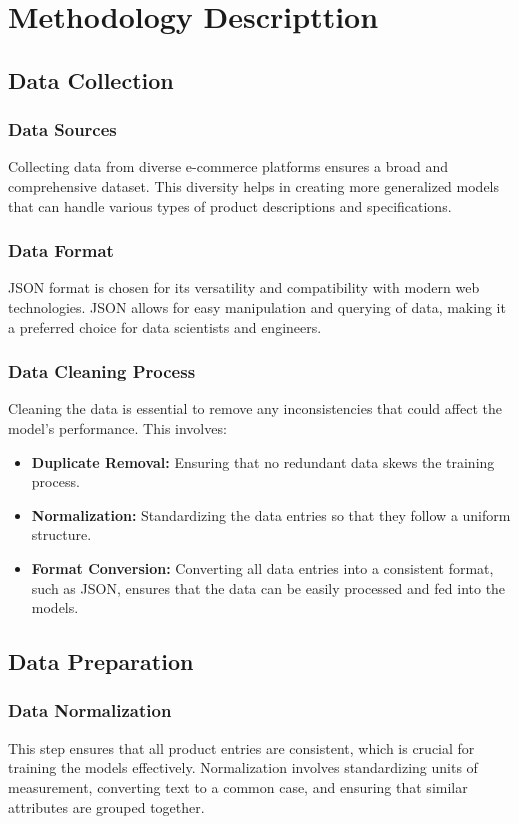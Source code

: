 \section{Methodology Descripttion}
\subsection{Data Collection}
\subsubsection{Data Sources}
Collecting data from diverse e-commerce platforms ensures a broad and comprehensive dataset. This diversity helps in creating more generalized models that can handle various types of product descriptions and specifications.

\subsubsection{Data Format}
JSON format is chosen for its versatility and compatibility with modern web technologies. JSON allows for easy manipulation and querying of data, making it a preferred choice for data scientists and engineers.

\subsubsection{Data Cleaning Process}
Cleaning the data is essential to remove any inconsistencies that could affect the model's performance. This involves:

\begin{itemize}
    \item \textbf{Duplicate Removal:} Ensuring that no redundant data skews the training process.
    \item \textbf{Normalization:} Standardizing the data entries so that they follow a uniform structure.
    \item \textbf{Format Conversion:} Converting all data entries into a consistent format, such as JSON, ensures that the data can be easily processed and fed into the models.
\end{itemize}

\subsection{Data Preparation}
\subsubsection{Data Normalization}
This step ensures that all product entries are consistent, which is crucial for training the models effectively. Normalization involves standardizing units of measurement, converting text to a common case, and ensuring that similar attributes are grouped together.

